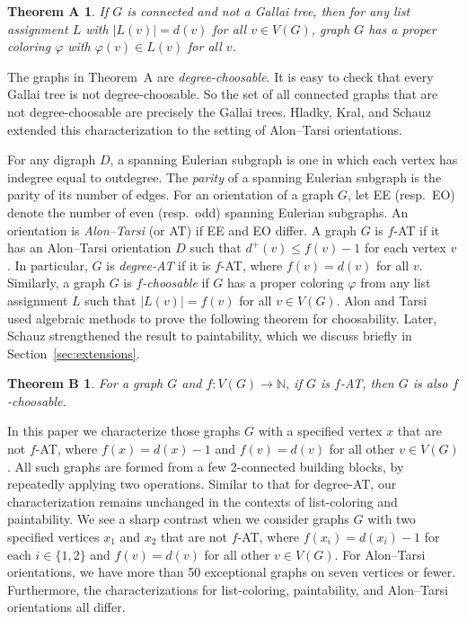 \documentclass[12pt]{article}
\theoremstyle{plain}
\newtheorem*{thmA}{Theorem A}
\newtheorem*{thmB}{Theorem B}
\theoremstyle{definition}
\theoremstyle{remark}
\newcommand{\IN}{\mathbb{N}}
\newcommand{\func}[3]{#1\colon #2 \rightarrow #3}
\begin{document}
\begin{thmA}
If $G$ is connected and not a Gallai tree, then for any list assignment $L$
with $|L(v)|=d(v)$ for all $v\in V(G)$, graph $G$ has a proper coloring
$\varphi$ with $\varphi(v)\in L(v)$ for all $v$.  
\end{thmA}

The graphs in Theorem~A are \emph{degree-choosable}.  It is easy to check
that every Gallai tree is not degree-choosable.  So the set of all
connected graphs that are not degree-choosable are precisely the Gallai trees.
Hladky, Kral, and Schauz~\cite{HKS} extended this characterization to the setting of
Alon--Tarsi orientations.

For any digraph $D$, a spanning Eulerian subgraph is one in which each vertex
has indegree equal to outdegree.  The \emph{parity} of a spanning Eulerian
subgraph is the parity of its number of edges.  For an orientation of a graph
$G$, let EE (resp.~EO) denote the number of even (resp.~odd) spanning Eulerian
subgraphs.  An orientation is \emph{Alon--Tarsi} (or AT) if EE and
EO differ.  A graph $G$ is $f$-AT if it has an Alon--Tarsi
orientation $D$ such that $d^+(v)\le f(v)-1$ for each vertex $v$.  In
particular, $G$ is \emph{degree-AT} if it is $f$-AT, where $f(v)=d(v)$ for all
$v$.  
Similarly, a graph $G$ is \emph{$f$-choosable} if $G$ has a proper coloring
$\varphi$ from any list assignment $L$ such that $|L(v)|=f(v)$ for all $v\in
V(G)$.
Alon and Tarsi~\cite{AlonT} used algebraic methods to prove the following
theorem for choosability.  Later, Schauz strengthened the result to
paintability, which we discuss briefly in Section~\ref{sec:extensions}.
\begin{thmB}
For a graph $G$ and $\func{f}{V(G)}{\IN}$,
if $G$ is $f$-AT, then $G$ is also \emph{$f$-choosable}.
\end{thmB}

In this paper we characterize those graphs $G$ with a specified vertex $x$
that are not $f$-AT, where $f(x)=d(x)-1$ and $f(v)=d(v)$ for all other $v\in
V(G)$.  All such graphs are formed from a few 2-connected building blocks, by
repeatedly applying two operations.  Similar to that for degree-AT, our
characterization remains unchanged in the contexts of list-coloring and
paintability.  We see a sharp contrast when we consider graphs $G$ with two
specified vertices $x_1$ and $x_2$ that are not $f$-AT, where
$f(x_i)=d(x_i)-1$ for each $i\in \{1,2\}$ and $f(v)=d(v)$ for all other
$v\in V(G)$.  For Alon--Tarsi orientations, we have more than 50 exceptional
graphs on seven vertices or fewer.  Furthermore, the characterizations for
list-coloring, paintability, and Alon--Tarsi orientations all differ.
\end{document}
